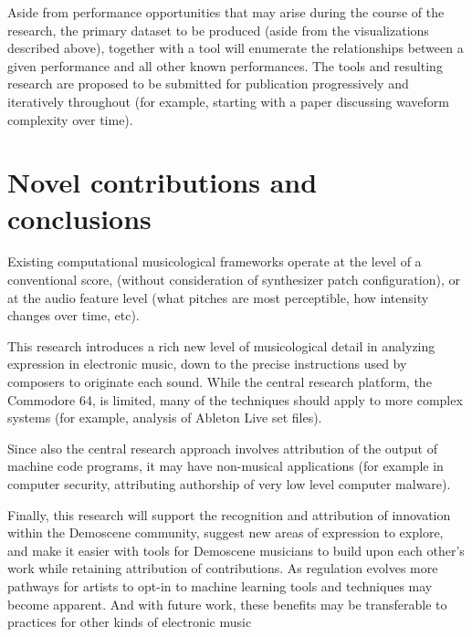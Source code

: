 \documentclass[10pt]{article}
\begin{document}
\begin{multicols*}{2}
Aside from performance opportunities that may arise during the course of the research, the primary dataset to be produced (aside from the visualizations described above), together with a tool will enumerate the relationships between a given performance and all other known performances.	The tools and resulting research are proposed to be submitted for publication progressively and iteratively throughout (for example, starting with a paper discussing waveform complexity over time).

\section{Novel contributions and conclusions}

Existing computational musicological frameworks operate at the level of a conventional score, (without consideration of synthesizer patch configuration), or at the audio feature level (what pitches are most perceptible, how intensity changes over time, etc).

This research introduces a rich new level of musicological detail in analyzing expression in electronic music, down to the precise instructions used by composers to originate each sound. While the central research platform, the Commodore 64, is limited, many of the techniques should apply to more complex systems (for example, analysis of Ableton Live set files).

Since also the central research approach involves attribution of the output of machine code programs, it may have non-musical applications (for example in computer security, attributing authorship of very low level computer malware).

Finally, this research will support the recognition and attribution of innovation within the Demoscene community, suggest new areas of expression to explore, and make it easier with tools for Demoscene musicians to build upon each other’s work while retaining attribution of contributions. As regulation evolves more pathways for artists to opt-in to machine learning tools and techniques may become apparent. And with future work, these benefits may be transferable to practices for other kinds of electronic music




\end{multicols*}

\nocite{*}


\end{document}
